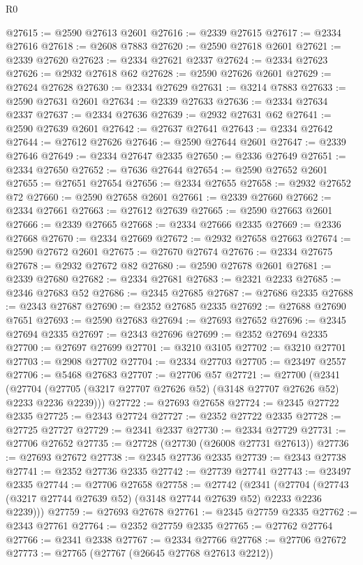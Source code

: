 \begin{lexlean}{R0}
\begin{coremodule}
@27615 := @2590 @27613 @2601
@27616 := @2339 @27615
@27617 := @2334 @27616
@27618 := @2608 @7883
@27620 := @2590 @27618 @2601
@27621 := @2339 @27620
@27623 := @2334 @27621 @2337
@27624 := @2334 @27623
@27626 := @2932 @27618 @62
@27628 := @2590 @27626 @2601
@27629 := @27624 @27628
@27630 := @2334 @27629
@27631 := @3214 @7883
@27633 := @2590 @27631 @2601
@27634 := @2339 @27633
@27636 := @2334 @27634 @2337
@27637 := @2334 @27636
@27639 := @2932 @27631 @62
@27641 := @2590 @27639 @2601
@27642 := @27637 @27641
@27643 := @2334 @27642
@27644 := @27612 @27626
@27646 := @2590 @27644 @2601
@27647 := @2339 @27646
@27649 := @2334 @27647 @2335
@27650 := @2336 @27649
@27651 := @2334 @27650
@27652 := @7636 @27644
@27654 := @2590 @27652 @2601
@27655 := @27651 @27654
@27656 := @2334 @27655
@27658 := @2932 @27652 @72
@27660 := @2590 @27658 @2601
@27661 := @2339 @27660
@27662 := @2334 @27661
@27663 := @27612 @27639
@27665 := @2590 @27663 @2601
@27666 := @2339 @27665
@27668 := @2334 @27666 @2335
@27669 := @2336 @27668
@27670 := @2334 @27669
@27672 := @2932 @27658 @27663
@27674 := @2590 @27672 @2601
@27675 := @27670 @27674
@27676 := @2334 @27675
@27678 := @2932 @27672 @82
@27680 := @2590 @27678 @2601
@27681 := @2339 @27680
@27682 := @2334 @27681
@27683 := @2321 @2233
@27685 := @2346 @27683 @52
@27686 := @2345 @27685
@27687 := @27686 @2335
@27688 := @2343 @27687
@27690 := @2352 @27685 @2335
@27692 := @27688 @27690 @7651
@27693 := @2590 @27683
@27694 := @27693 @27652
@27696 := @2345 @27694 @2335
@27697 := @2343 @27696
@27699 := @2352 @27694 @2335
@27700 := @27697 @27699
@27701 := @3210 @3105
@27702 := @3210 @27701
@27703 := @2908 @27702
@27704 := @2334 @27703
@27705 := @23497 @2557
@27706 := @5468 @27683
@27707 := @27706 @57
@27721 := @27700
    (@2341 (@27704 (@27705 (@3217 @27707 @27626 @52) (@3148 @27707 @27626 @52) @2233 @2236 @2239)))
@27722 := @27693 @27658
@27724 := @2345 @27722 @2335
@27725 := @2343 @27724
@27727 := @2352 @27722 @2335
@27728 := @27725 @27727
@27729 := @2341 @2337
@27730 := @2334 @27729
@27731 := @27706 @27652
@27735 := @27728 (@27730 (@26008 @27731 @27613))
@27736 := @27693 @27672
@27738 := @2345 @27736 @2335
@27739 := @2343 @27738
@27741 := @2352 @27736 @2335
@27742 := @27739 @27741
@27743 := @23497 @2335
@27744 := @27706 @27658
@27758 := @27742
    (@2341 (@27704 (@27743 (@3217 @27744 @27639 @52) (@3148 @27744 @27639 @52) @2233 @2236 @2239)))
@27759 := @27693 @27678
@27761 := @2345 @27759 @2335
@27762 := @2343 @27761
@27764 := @2352 @27759 @2335
@27765 := @27762 @27764
@27766 := @2341 @2338
@27767 := @2334 @27766
@27768 := @27706 @27672
@27773 := @27765 (@27767 (@26645 @27768 @27613 @2212))

\end{coremodule}
\end{lexlean}
